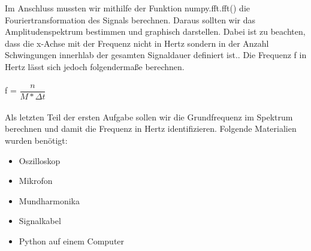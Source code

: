 \documentclass[12pt, oneside, a4paper, \docLanguage]{report}
\begin{document}
\newpage
Im Anschluss mussten wir mithilfe der Funktion numpy.fft.fft() die Fouriertransformation des Signals berechnen. Daraus sollten wir das Amplitudenspektrum bestimmen und graphisch darstellen.
Dabei ist zu beachten, dass die x-Achse mit der Frequenz nicht in Hertz sondern in der Anzahl Schwingungen innerhlab der gesamten Signaldauer definiert ist..
Die Frequenz f in Hertz lässt sich jedoch folgendermaße berechnen.
\\~\\
f = $\dfrac{n}{M * \Delta t}$
\\~\\
Als letzten Teil der ersten Aufgabe sollen wir die Grundfrequenz im Spektrum berechnen und damit die Frequenz in Hertz identifizieren.
Folgende Materialien wurden benötigt: ~\par
\begin{itemize}
	\item Oszilloskop
	\item Mikrofon
	\item Mundharmonika
	\item Signalkabel
	\item Python auf einem Computer
\end{itemize}
\newpage
\end{document}
